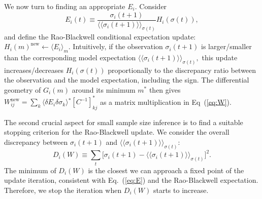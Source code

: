 \documentclass[prx,twocolumn,twoside,showpacs,superscriptaddress]{revtex4-1}
\begin{document}

We now turn to finding an appropriate $E_i.$ Consider
\begin{equation}
\label{eq:E}
E_i(t) \equiv \frac{\sigma_i(t+1)}{\langle \langle \sigma_i(t+1) \rangle \rangle_{\sigma(t)}} H_i(\sigma(t)),
\end{equation}
and  define the Rao-Blackwell conditional expectation update: $H_i(m)^{\textrm{new}} \leftarrow \langle E_i \rangle_{m}.$ Intuitively, if the observation $\sigma_i(t+1)$ is larger/smaller than the corresponding model expectation $\langle \langle \sigma_i(t+1)\rangle \rangle_{\sigma(t)},$ this update increases/decreases $H_i(\sigma(t))$ proportionally to the discrepancy ratio between the observation and the model expectation, including the  sign. The differential geometry of $G_i(m)$ around its minimum $m^*$ then gives
$W_{ij}^{\textrm{new}} = \sum_k \langle \delta E_i \delta \sigma_k  \rangle{^*} [C^{-1}]^{*}_{kj}$ as a matrix multiplication in Eq~(\ref{eq:W}).

The second crucial aspect for small sample size inference is to find a suitable stopping criterion for the Rao-Blackwell update. %
We consider the overall discrepancy between ${\sigma_i(t+1)}$ and ${\langle\langle \sigma_i(t+1) \rangle\rangle_{\sigma(t)}}$:
\begin{equation}
\label{eq:D}
D_i(W)\equiv\sum_{t} \big[ \sigma_i(t+1) - \langle \langle \sigma_i(t+1) \rangle \rangle_{\sigma(t)} \big]^2.
\end{equation}
The minimum of $D_i(W)$ is the closest we can approach a fixed point of the update iteration, consistent with Eq.~(\ref{eq:E}) and the Rao-Blackwell expectation. Therefore, we stop the iteration when $D_i(W)$ starts to increase.
\end{document}
